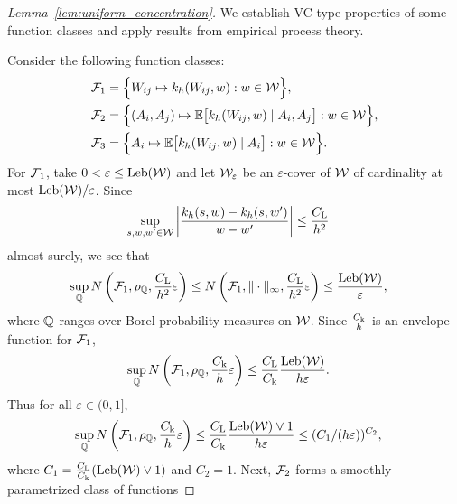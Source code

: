 \begin{proof}[Lemma~\ref{lem:uniform_concentration}]

  We establish VC-type properties of some function
  classes and apply results from empirical process theory.


  Consider the following function classes:
  \begin{align*}
    \mathcal{F}_1
    &=
    \Big\{
    W_{ij} \mapsto
    k_h(W_{ij},w)
    : w \in \mathcal{W}
    \Big\}, \\
    \mathcal{F}_2
    &=
    \Big\{
    (A_i, A_j) \mapsto
    \mathbb{E}\big[ k_h(W_{ij},w) \mid A_i, A_j \big]
    : w \in \mathcal{W}
    \Big\}, \\
    \mathcal{F}_3
    &=
    \Big\{
    A_i \mapsto
    \mathbb{E}\big[ k_h(W_{ij},w) \mid A_i \big]
    : w \in \mathcal{W}
    \Big\}.
  \end{align*}
  For $\mathcal{F}_1$,
  take $0 < \varepsilon \leq \operatorname{Leb}(\mathcal{W})$
  and let $\mathcal{W}_\varepsilon$ be an
  $\varepsilon$-cover of $\mathcal{W}$
  of cardinality at most $\operatorname{Leb}(\mathcal{W})/\varepsilon$.
  Since
  \begin{align*}
    \sup_{s, w, w' \in \mathcal{W}}
    \left|
    \frac{k_h(s,w) - k_h(s,w')}
    {w-w'}
    \right|
    &\leq
    \frac{C_\mathrm{L}}{h^2}
  \end{align*}
  almost surely,
  we see that
  \begin{align*}
    \sup_{\mathbb{Q}}
    N\left(\mathcal{F}_1, \rho_{\mathbb{Q}},
      \frac{C_\mathrm{L}}{h^2} \varepsilon \right)
    &\leq
    N\left(\mathcal{F}_1, \|\cdot\|_\infty,
      \frac{C_\mathrm{L}}{h^2} \varepsilon \right)
    \leq
    \frac{\operatorname{Leb}(\mathcal{W})}{\varepsilon},
  \end{align*}
  where $\mathbb{Q}$ ranges over Borel
  probability measures on $\mathcal{W}$.
  Since
  $\frac{C_\mathrm{k}}{h}$
  is an envelope function for $\mathcal{F}_1$,
  \begin{align*}
    \sup_{\mathbb{Q}}
    N\left(\mathcal{F}_1, \rho_{\mathbb{Q}},
      \frac{C_\mathrm{k}}{h} \varepsilon \right)
    &\leq
    \frac{C_\mathrm{L}}{C_\mathrm{k}}
    \frac{\operatorname{Leb}(\mathcal{W})}{h \varepsilon}.
  \end{align*}
  Thus for all $\varepsilon \in (0,1]$,
  \begin{align*}
    \sup_{\mathbb{Q}}
    N\left(\mathcal{F}_1, \rho_{\mathbb{Q}},
      \frac{C_\mathrm{k}}{h} \varepsilon \right)
    &\leq
    \frac{C_\mathrm{L}}{C_\mathrm{k}}
    \frac{\operatorname{Leb}(\mathcal{W}) \vee 1}{h \varepsilon}
    \leq
    (C_1/(h\varepsilon))^{C_2},
  \end{align*}
  where
  $C_1 = \frac{C_\mathrm{L}}{C_\mathrm{k}} (\operatorname{Leb}(\mathcal{W}) \vee 1)$
  and $C_2 = 1$.
  Next, $\mathcal{F}_2$ forms a smoothly parametrized class of functions

\end{proof}
